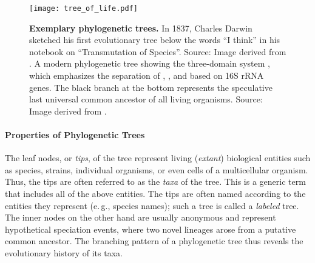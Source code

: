 \begin{figure}[hpbt]
    \centering
    \texttt{[image: tree\_of\_life.pdf]}
    \begin{subfigure}{0pt}
        \label{fig:tree_of_life:sub:darwin}
    \end{subfigure}
    \begin{subfigure}{0pt}
        \label{fig:tree_of_life:sub:woese}
    \end{subfigure}
    \caption[Exemplary phylogenetic trees]{
        \textbf{Exemplary phylogenetic trees.}
        In 1837, Charles Darwin sketched his first evolutionary tree below the words ``I think''
        in his notebook on ``Transmutation of Species''.
        Source: Image derived from \cite{DarwinTreeOfLife1837}.
        A modern phylogenetic tree showing the three-domain system \cite{Woese1977,Woese1990},
        which emphasizes the separation of , , and 
        based on 16S rRNA genes.
        The black branch at the bottom represents the speculative last universal common ancestor of all living organisms.
        Source: Image derived from \cite{WoeseTreeOfLife2006}.
    }
    \label{fig:tree_of_life}
\end{figure}

\paragraph{Properties of Phylogenetic Trees}
\label{ch:Foundations:sec:TreeOfLife:sub:PhylogeneticTrees:par:TreeProperties}

The leaf nodes, or \emph{tips}, of the tree represent living (\emph{extant}) biological entities
such as species, strains, individual organisms, or even cells of a multicellular organism.
Thus, the tips are often referred to as the \emph{taxa} of the tree.
This is a generic term that includes all of the above entities.
The tips are often named according to the entities they represent (e.\,g., species names);
such a tree is called a \emph{labeled} tree.
The inner nodes on the other hand are usually anonymous and
represent hypothetical speciation events, where two novel lineages arose from a putative common ancestor.
The branching pattern of a phylogenetic tree thus reveals the evolutionary history of its taxa.

